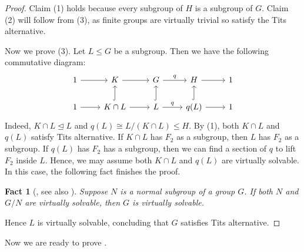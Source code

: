 \documentclass[11pt]{amsart}
\theoremstyle{plain}
\newtheorem{FACT}[THM]{Fact}
\theoremstyle{definition}
\newcommand{\<}{\langle}
\renewcommand{\>}{\rangle}
\begin{document}
\begin{proof}
    Claim (1) holds because every subgroup of $H$ is a subgroup of $G$. Claim
    (2) will follow from (3), as finite groups are virtually trivial so satisfy the Tits alternative.
    
    Now we prove (3). Let $L \le G$ be a subgroup. Then we have the following commutative diagram:
    \[
    \begin{tikzcd}
    1 \rar &K \rar &G \rar{q} &H \rar &1 \\
    1 \rar &K \cap L \rar  \arrow[u, hook]  &L \rar{q} \arrow[u, hook] &q(L)  \rar \arrow[u, hook] &1
    \end{tikzcd}
    \]
    Indeed, $K\cap L \trianglelefteq L$ and $q(L) \cong L/(K\cap L) \le H$. By (1), both $K \cap L$ and $q(L)$ satisfy Tits alternative. If $K \cap L$ has $F_2$ as a subgroup, then $L$ has $F_2$ as a subgroup. If $q(L)$ has $F_2$ has a subgroup, then we can find a section of $q$ to lift $F_2$ inside $L$. Hence, we may assume both $K \cap L$ and $q(L)$ are virtually solvable. In this case, the following fact finishes the proof.
    \begin{FACT}[{\cite[Lemma 5.5]{dinh2012}, see also \cite[Lemme 6.1]{Cantat2011}}]
    \label{fact:vsol}
        Suppose $N$ is a normal subgroup of a group $G$. If both $N$ and $G/N$ are virtually solvable, then $G$ is virtually solvable.
    \end{FACT}\noindent
    Hence $L$ is virtually solvable, concluding that $G$ satisfies Tits alternative.
\end{proof}

Now we are ready to prove .
\end{document}
